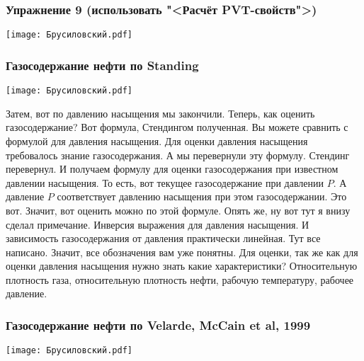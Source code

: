 \documentclass[main.tex]{subfiles}
\begin{document}
\subsubsection{Упражнение 9 (использовать "<Расчёт PVT-свойств">)}

\begin{center}
\texttt{[image: Брусиловский.pdf]}
\end{center}

\subsubsection{Газосодержание нефти по Standing}

\begin{center}
\texttt{[image: Брусиловский.pdf]}
\end{center}

Затем, вот по давлению насыщения мы закончили.
Теперь, как оценить газосодержание?
Вот формула, Стендингом полученная.
Вы можете сравнить с формулой для давления насыщения.
Для оценки давления насыщения требовалось знание газосодержания.
А мы перевернули эту формулу.
Стендинг перевернул.
И получаем формулу для оценки газосодержания при известном давлении насыщения.
То есть, вот текущее газосодержание при давлении $P$.
А давление $P$ соответствует давлению насыщения при этом газосодержании.
Это вот.
Значит, вот оценить можно по этой формуле.
Опять же, ну вот тут я внизу сделал примечание.
Инверсия выражения для давления насыщения.
И зависимость газосодержания от давления практически линейная.
Тут все написано.
Значит, все обозначения вам уже понятны.
Для оценки, так же как для оценки давления насыщения нужно знать какие характеристики?
Относительную плотность газа, относительную плотность нефти, рабочую температуру, рабочее давление.

\subsubsection{Газосодержание нефти по Velarde, McCain et al, 1999}

\begin{center}
\texttt{[image: Брусиловский.pdf]}
\end{center}
\end{document}
